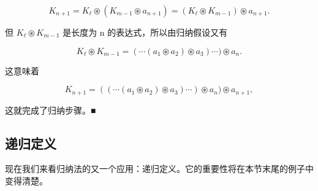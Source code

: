 \begin{example}
\[
K_{n+1}=K_{\ell}\circledast(K_{m-1}\circledast a_{n+1})=(K_{\ell}\circledast K_{m-1})\circledast a_{n+1}.
\]

但 $ K_{\ell} \circledast K_{m-1} $ 是长度为 n 的表达式，所以由归纳假设又有

\[
K_{\ell}\circledast K_{m-1}=\left(\cdots(a_{1}\circledast a_{2})\circledast a_{3}\right)\cdots\big)\circledast a_{n}.
\]

这意味着

\[
K_{n+1}=\left(\left(\cdots\left(a_{1}\circledast a_{2}\right)\circledast a_{3}\right)\cdots\right)\circledast a_{n})\circledast a_{n+1},
\]

这就完成了归纳步骤。■

\end{example}

\subsection*{递归定义}

现在我们来看归纳法的又一个应用：递归定义。它的重要性将在本节末尾的例子中变得清楚。

